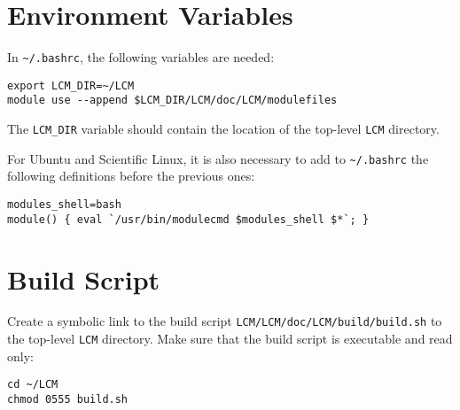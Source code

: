 \documentclass{article}
\begin{document}
\section{Environment Variables}
In \verb+~/.bashrc+, the following variables are needed:
\begin{verbatim}
export LCM_DIR=~/LCM
module use --append $LCM_DIR/LCM/doc/LCM/modulefiles
\end{verbatim}
The \verb+LCM_DIR+ variable should contain the location of the
top-level \verb+LCM+ directory.

For Ubuntu and Scientific Linux, it is also necessary to add to \verb+~/.bashrc+
the following definitions before the previous ones:
\begin{verbatim}
modules_shell=bash
module() { eval `/usr/bin/modulecmd $modules_shell $*`; }
\end{verbatim}

\section{Build Script}
Create a symbolic link to the build script
\verb+LCM/LCM/doc/LCM/build/build.sh+ to the top-level \verb+LCM+
directory. Make sure that the build script is executable and
read only:
\begin{verbatim}
cd ~/LCM
chmod 0555 build.sh
\end{verbatim}
\end{document}
